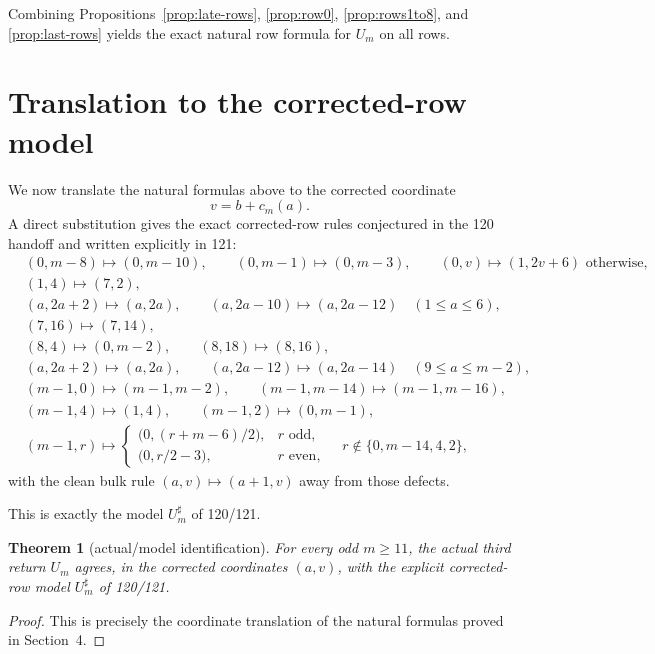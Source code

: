 \documentclass[11pt]{article}
\newtheorem{theorem}{Theorem}[section]
\newcommand{\1}{\mathbf 1}
\begin{document}
Combining Propositions~\ref{prop:late-rows}, \ref{prop:row0},
\ref{prop:rows1to8}, and \ref{prop:last-rows} yields the exact natural
row formula for $U_m$ on all rows.

\section{Translation to the corrected-row model}

We now translate the natural formulas above to the corrected coordinate
\[
v=b+c_m(a).
\]
A direct substitution gives the exact corrected-row rules conjectured in the 120
handoff and written explicitly in 121:
\begin{align*}
&(0,m-8)\mapsto(0,m-10),\qquad (0,m-1)\mapsto(0,m-3),\qquad
(0,v)\mapsto(1,2v+6)\text{ otherwise},\\
&(1,4)\mapsto(7,2),\\
&(a,2a+2)\mapsto(a,2a),\qquad (a,2a-10)\mapsto(a,2a-12)
\quad(1\le a\le 6),\\
&(7,16)\mapsto(7,14),\\
&(8,4)\mapsto(0,m-2),\qquad (8,18)\mapsto(8,16),\\
&(a,2a+2)\mapsto(a,2a),\qquad (a,2a-12)\mapsto(a,2a-14)
\quad(9\le a\le m-2),\\
&(m-1,0)\mapsto(m-1,m-2),\qquad (m-1,m-14)\mapsto(m-1,m-16),\\
&(m-1,4)\mapsto(1,4),\qquad (m-1,2)\mapsto(0,m-1),\\
&(m-1,r)\mapsto
\begin{cases}
\bigl(0,(r+m-6)/2\bigr), & r\text{ odd},\\
\bigl(0,r/2-3\bigr), & r\text{ even},
\end{cases}
\quad r\notin\{0,m-14,4,2\},
\end{align*}
with the clean bulk rule $(a,v)\mapsto(a+1,v)$ away from those defects.

This is exactly the model $U_m^{\sharp}$ of 120/121.

\begin{theorem}[actual/model identification]\label{thm:actual-equals-model}
For every odd $m\ge 11$, the actual third return $U_m$ agrees, in the
corrected coordinates $(a,v)$, with the explicit corrected-row model
$U_m^{\sharp}$ of 120/121.
\end{theorem}

\begin{proof}
This is precisely the coordinate translation of the natural formulas proved in
Section~4.
\end{proof}
\end{document}
